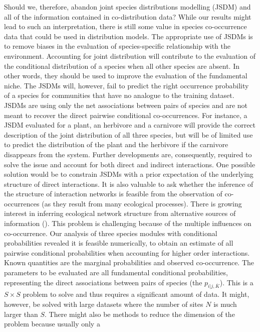 Should we, therefore, abandon joint species distributions modelling (JSDM) and all of the information contained in co-distribution data? While our results might lead to such an interpretation, there is still some value in species co-occurrence data that could be used in distribution models. The appropriate use of JSDMs is to remove biases in the evaluation of species-specific relationship with the environment. Accounting for joint distribution will contribute to the evaluation of the conditional distribution of a species when all other species are absent. In other words, they should be used to improve the evaluation of the fundamental niche. The JSDMs will, however, fail to
predict the right occurrence probability of a species for communities that
have no analogue to the training dataset. JSDMs are using only the net
associations between pairs of species and are not meant to recover the direct
pairwise conditional co-occurrences. For instance, a JSDM evaluated for a plant, an herbivore and a carnivore will provide the correct description of the joint distribution of all three species, but will be of limited use to predict the distribution of the plant and the herbivore if the carnivore disappears from the system. Further developments are, consequently, required to solve the issue and account for both direct and indirect interactions. One possible solution would be to constrain JSDMs with a prior expectation of the underlying
structure of direct interactions.
%
It is also valuable to ask whether the inference of the structure of interaction
networks is feasible from the observation of co-occurrences (as they result
from many ecological processes). There is growing interest in inferring
ecological network structure from alternative sources of information
(\citealt{Gravel2013Inferring, Castilla2015Inferring}). This problem is challenging
because of the multiple influences on co-occurrence. Our analysis of three
species modules with conditional probabilities revealed it is feasible numerically, to obtain an estimate of all pairwise
conditional probabilities when accounting for higher order interactions. Known
quantities are the marginal probabilities and observed co-occurrence. The
parameters to be evaluated are all fundamental conditional probabilities,
representing the direct associations between pairs of species (the
$p_{i|j,\overline{K}}$). This is a $S \times S$ problem to solve and thus
requires a significant amount of data. It might, however, be solved with large
datasets where the number of sites $N$ is much larger than $S$. There might
also be methods to reduce the dimension of the problem because usually only a
